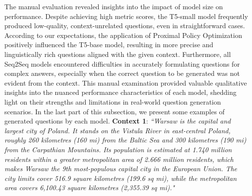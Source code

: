 \documentclass{article}
\begin{document}
The manual evaluation revealed insights into the impact of model size on performance. Despite achieving high metric scores, the T5-small model frequently produced low-quality, context-unrelated questions, even in straightforward cases. According to our expectations, the application of Proximal Policy Optimization positively influenced the T5-base model, resulting in more precise and linguistically rich questions aligned with the given context. Furthermore, all Seq2Seq models encountered difficulties in accurately formulating questions for complex answers, especially when the correct question to be generated was not evident from the context.
This manual examination provided valuable qualitative insights into the nuanced performance characteristics of each model, shedding light on their strengths and limitations in real-world question generation scenarios. In the last part of this subsection, we present some examples of generated questions by each model.
\newline
\newline
\textbf{Context 1}: \textit{``Warsaw is the capital and largest city of Poland. It stands on the Vistula River in east-central Poland, roughly 260 kilometres (160 mi) from the Baltic Sea and 300 kilometres (190 mi) from the Carpathian Mountains. Its population is estimated at 1.740 million residents within a greater metropolitan area of 2.666 million residents, which makes Warsaw the 9th most-populous capital city in the European Union. The city limits cover 516.9 square kilometres (199.6 sq mi), while the metropolitan area covers 6,100.43 square kilometres (2,355.39 sq mi)."}

\begin{table}[h]
\centering
{}
     \caption{Question Generation Results for Context 1: Llama and PPO-trained T5 answer and context. T5 small and base fail to generate the correct answer.}
    \label{table:q1}
\end{table}
\end{document}
